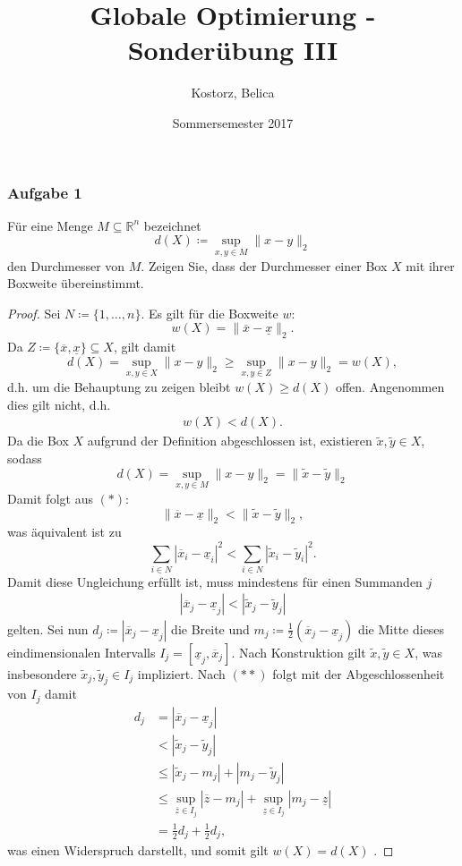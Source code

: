 \documentclass[12pt]{extreport} %
\title{Globale Optimierung - Sonderübung III}
\author{Kostorz, Belica}
\date{Sommersemester 2017}
\newcommand{\R}{\mathbb{R}}
\begin{document}
\thispagestyle{empty}
\thispagestyle{firststyle}

\subsubsection*{Aufgabe 1}

Für eine Menge $M \subseteq \R^n$ bezeichnet 
	$$ d(X) \coloneqq \sup_{x,y \in M} \| x - y \|_2 $$
den Durchmesser von $M$. Zeigen Sie, dass der Durchmesser einer Box $X$ mit ihrer Boxweite übereinstimmt.

\begin{proof}
	Sei $N \coloneqq \{1, \dotsc, n\}$. Es gilt für die Boxweite $w$:
	$$ w(X) = \| \overline{x} - \underline{x} \|_2. $$ 
	Da $Z \coloneqq \{ \overline{x}, \underline{x} \} \subseteq X$, gilt damit
	$$ d(X) = \sup_{x,y \in X} \| x - y \|_2 \geq \sup_{x,y \in Z } \| x - y \|_2 = w(X), $$
	d.h. um die Behauptung zu zeigen bleibt $w(X) \geq d(X)$ offen. Angenommen dies gilt nicht, d.h.
	\begin{align*}
		 w(X) < d(X). \tag*{$(*)$}
	\end{align*}
	Da die Box $X$ aufgrund der Definition abgeschlossen ist, existieren $\tilde{x}, \tilde{y} \in X$, sodass
	$$ d(X) = \sup_{x,y \in M} \| x - y \|_2 = \| \tilde{x} - \tilde{y} \|_2 $$
	Damit folgt aus $(*)$:
	 $$ \| \overline{x} - \underline{x} \|_2 < \| \tilde{x} - \tilde{y} \|_2, $$
	 was äquivalent ist zu
	 $$ \sum_{i \in N} | \overline{x}_i - \underline{x}_i |^2 < \sum_{ i \in N} | \tilde{x}_i - \tilde{y}_i |^2. $$
	Damit diese Ungleichung erfüllt ist, muss mindestens für einen Summanden $j$ 
	\begin{align*}
		| \overline{x}_j - \underline{x}_j | <  | \tilde{x}_j - \tilde{y}_j | \tag*{$(**)$}
	\end{align*} 
	gelten. Sei nun $d_j \coloneqq | \overline{x}_j - \underline{x}_j |$ die Breite und $m_j \coloneqq \frac{1}{2} \left( \overline{x}_j - \underline{x}_j \right)$ die Mitte dieses eindimensionalen Intervalls $I_j = \left[ \underline{x}_j, \overline{x}_j \right]$. Nach Konstruktion gilt $\tilde{x}, \tilde{y} \in X$, was insbesondere $\tilde{x}_j, \tilde{y}_j \in I_j$ impliziert. Nach $(**)$ folgt mit der Abgeschlossenheit von $I_j$ damit
	\begin{align*}
		d_j & = \left| \overline{x}_j - \underline{x}_j \right| \\
			& <  \left| \tilde{x}_j - \tilde{y}_j \right| \\
			& \leq \left| \tilde{x}_j - m_j \right| + \left| m_j - \tilde{y}_j \right| \\
			& \leq \sup_{\overline{z} \in I_j} \left| \overline{z} - m_j \right| + \sup_{\underline{z} \in I_j} \left| m_j - \underline{z} \right|  \\ 
			& =  \frac{1}{2} d_j + \frac{1}{2} d_j,
	\end{align*}
	was einen Widerspruch darstellt, und somit gilt $w(X) = d(X)$ .
\end{proof}
\end{document}
